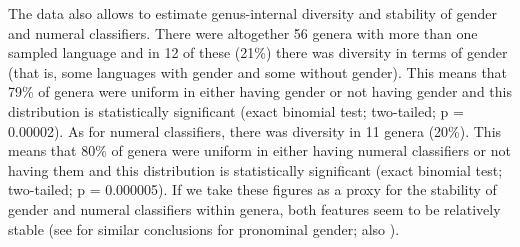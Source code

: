 \documentclass[output=collectionpaper]{langsci/langscibook}
\begin{document}
The data also allows to estimate genus-internal diversity and stability of gender and numeral classifiers. There were altogether 56 genera with more than one sampled language and in 12 of these (21\%) there was diversity in terms of gender (that is, some languages with gender and some without gender). This means that 79\% of genera were uniform in either having gender or not having gender and this distribution is statistically significant (exact binomial test; two-tailed; p = 0.00002). As for numeral classifiers, there was diversity in 11 genera (20\%). This means that 80\% of genera were uniform in either having numeral classifiers or not having them and this distribution is statistically significant (exact binomial test; two-tailed; p = 0.000005). If we take these figures as a proxy for the stability of gender and numeral classifiers within genera, both features seem to be relatively stable (see \citealt[433--434]{Bickel2013b} for similar conclusions for pronominal gender; also \citealt[196--202]{Dahl2004}).
\end{document}

